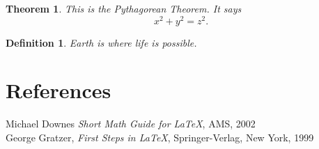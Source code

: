 \documentclass[12pt]{article}
\newtheorem{theorem}{Theorem}
\newtheorem{definition}{Definition}
\begin{document}
\begin{theorem}
  This is the Pythagorean Theorem. It says
  \begin{equation}
    x^{2}+y^{2}=z^{2}.
  \end{equation}
\end{theorem}
\begin{definition}
Earth is where life is possible.
\end{definition}

\section{References}
Michael Downes \emph{Short Math Guide for \LaTeX}, AMS, 2002\\[0.2in]
George Gratzer, \emph{First Steps in \LaTeX}, Springer-Verlag, New York, 1999\\[0.2in]
\end{document}
